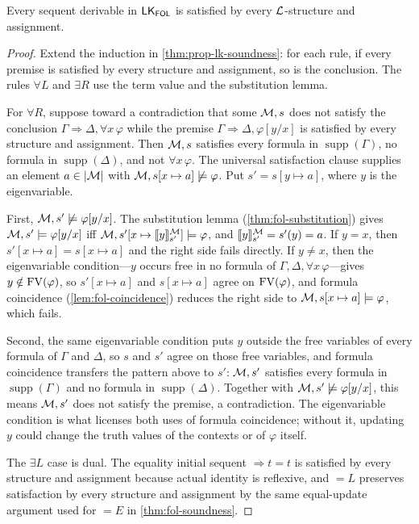 \begin{theorem}
\label{thm:fol-lk-soundness}
Every sequent derivable in \(\mathsf{LK}_{\mathsf{FOL}}\) is satisfied by every
\(\mathcal{L}\)-structure and assignment.
\end{theorem}
\begin{proof}
Extend the induction in \cref{thm:prop-lk-soundness}: for each rule,
if every premise is satisfied by every structure and assignment, so is the
conclusion.  The rules \(\forall L\) and \(\exists R\) use the term value
and the substitution lemma.

For \(\forall R\), suppose toward a contradiction that some \(\mathcal M,s\)
does not satisfy the conclusion
\(\Gamma\Rightarrow\Delta,\forall x\,\varphi\) while the premise
\(\Gamma\Rightarrow\Delta,\varphi[y/x]\) is satisfied by every structure
and assignment.  Then \(\mathcal M,s\) satisfies every formula in
\(\operatorname{supp}(\Gamma)\), no formula in
\(\operatorname{supp}(\Delta)\), and not \(\forall x\,\varphi\).  The
universal satisfaction clause supplies an element \(a\in\lvert\mathcal M\rvert\)
with \(\mathcal M,s[x\mapsto a]\not\models\varphi\).  Put
\(s'=s[y\mapsto a]\), where \(y\) is the eigenvariable.

First, \(\mathcal M,s'\not\models\varphi[y/x]\).  The substitution lemma
(\cref{thm:fol-substitution}) gives
\(\mathcal M,s'\models\varphi[y/x]\) iff
\(\mathcal M,s'[x\mapsto\llbracket y\rrbracket^{\mathcal M}_{s'}]\models\varphi\), and
\(\llbracket y\rrbracket^{\mathcal M}_{s'}=s'(y)=a\).  If \(y=x\), then
\(s'[x\mapsto a]=s[x\mapsto a]\) and the right side fails directly.  If
\(y\ne x\), then the eigenvariable condition---\(y\) occurs free in no
formula of \(\Gamma,\Delta,\forall x\,\varphi\)---gives
\(y\notin\operatorname{FV}(\varphi)\), so \(s'[x\mapsto a]\) and
\(s[x\mapsto a]\) agree on \(\operatorname{FV}(\varphi)\), and formula coincidence
(\cref{lem:fol-coincidence}) reduces the right side to
\(\mathcal M,s[x\mapsto a]\models\varphi\), which fails.

Second, the same eigenvariable condition puts \(y\) outside the free
variables of every formula of \(\Gamma\) and \(\Delta\), so \(s\) and
\(s'\) agree on those free variables, and formula coincidence transfers
the pattern above to \(s'\): \(\mathcal M,s'\) satisfies every formula in
\(\operatorname{supp}(\Gamma)\) and no formula in
\(\operatorname{supp}(\Delta)\).  Together with
\(\mathcal M,s'\not\models\varphi[y/x]\), this means \(\mathcal M,s'\) does not
satisfy the premise, a contradiction.  The eigenvariable condition is what
licenses both uses of formula coincidence; without it, updating \(y\)
could change the truth values of the contexts or of \(\varphi\) itself.

The \(\exists L\) case is dual.  The equality initial sequent
\(\Rightarrow t=t\) is satisfied by every structure and assignment
because actual identity is reflexive, and \(=L\) preserves satisfaction by
every structure and assignment by the same equal-update argument used for
\(=E\) in \cref{thm:fol-soundness}.
\end{proof}

